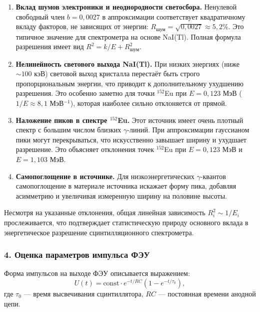 \documentclass[12pt,a4paper]{article}
\begin{document}
\begin{enumerate}
    \item \textbf{Вклад шумов электроники и неоднородности светосбора.} Ненулевой свободный член $b = 0,0027$ в аппроксимации соответствует квадратичному вкладу факторов, не зависящих от энергии: $R_{\text{шум}} = \sqrt{0,0027} \approx 5,2\%$. Это типичное значение для спектрометра на основе NaI(Tl). Полная формула разрешения имеет вид $R^2 = k/E + R_{\text{шум}}^2$.
    
    \item \textbf{Нелинейность светового выхода NaI(Tl).} При низких энергиях (ниже $\sim 100$ кэВ) световой выход кристалла перестаёт быть строго пропорциональным энергии, что приводит к дополнительному ухудшению разрешения. Это особенно заметно для точки $^{152}$Eu при $E = 0,123$ МэВ ($1/E \approx 8,1$ МэВ$^{-1}$), которая наиболее сильно отклоняется от прямой.
    
    \item \textbf{Наложение пиков в спектре $^{152}$Eu.} Этот источник имеет очень плотный спектр с большим числом близких $\gamma$-линий. При аппроксимации гауссианом пики могут перекрываться, что искусственно завышает ширину и ухудшает разрешение. Это объясняет отклонения точек $^{152}$Eu при $E = 0,123$ МэВ и $E = 1,103$ МэВ.
    
    \item \textbf{Самопоглощение в источнике.} Для низкоэнергетических $\gamma$-квантов самопоглощение в материале источника искажает форму пика, добавляя асимметрию и увеличивая измеренную ширину на половине высоты.
\end{enumerate}

Несмотря на указанные отклонения, общая линейная зависимость $R_i^2 \sim 1/E_i$ прослеживается, что подтверждает статистическую природу основного вклада в энергетическое разрешение сцинтилляционного спектрометра.



\subsubsection*{4. Оценка параметров импульса ФЭУ}

Форма импульсов на выходе ФЭУ описывается выражением:
\begin{equation}
    U(t) = \text{const} \cdot e^{-t/RC} \left(1 - e^{-t/\tau_0}\right),
\end{equation}
где $\tau_0$ --- время высвечивания сцинтиллятора, $RC$ --- постоянная времени анодной цепи.
\end{document}
